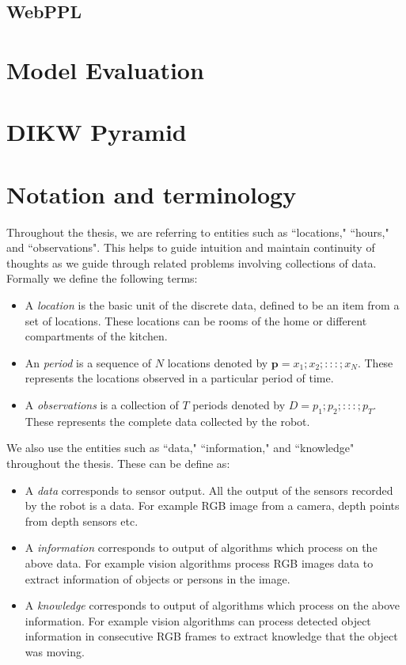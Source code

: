 \subsection{WebPPL}

\section{Model Evaluation}

\section{DIKW Pyramid }

\section{Notation and terminology}
Throughout the thesis, we are referring to entities such as ``locations," ``hours," and ``observations".
This helps to guide intuition and maintain continuity of thoughts as we guide through related problems involving collections of data.
Formally we define the following terms:
\begin{itemize}
	\item A \emph{location} is the basic unit of the discrete data, defined to be an item from a set of locations. These locations can be rooms of the home or different compartments of the kitchen. 
	\item An \emph{period} is a sequence of $N$ locations denoted by $\textbf{p} = {x_1;x_2;:::;x_N}$. These represents the locations observed in a particular period of time.
	\item A \emph{observations} is a collection of $T$ periods denoted by $ D = {p_1;p_2;:::;p_T}$. These represents the complete data collected by the robot.
\end{itemize}


We also use the entities such as ``data," ``information," and ``knowledge" throughout the thesis. These can be define as:
\begin{itemize}
	\item A \emph{data} corresponds to sensor output. All the output of the sensors recorded by the robot is a data. For example RGB image from a camera, depth points from depth sensors etc.
	\item A \emph{information} corresponds to output of algorithms which process on the above data. For example vision algorithms process RGB images data to extract information of objects or persons in the image.
	\item A \emph{knowledge} corresponds to output of algorithms which process on the above information. For example vision algorithms can process detected object information in consecutive RGB frames to extract knowledge that the object was moving.
\end{itemize}